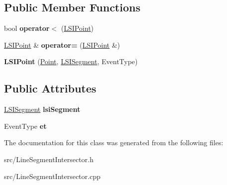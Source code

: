 \subsection*{Public Member Functions}
\begin{DoxyCompactItemize}
\item 
\mbox{\label{classLineSegmentIntersector_1_1LSIPoint_a1b3ac13032c42bad86516cbcf953db66}} 
bool {\bfseries operator$<$} (\hyperlink{classLineSegmentIntersector_1_1LSIPoint}{L\+S\+I\+Point})
\item 
\mbox{\label{classLineSegmentIntersector_1_1LSIPoint_ac547954aaa117fd416bb84a4a7447e56}} 
\hyperlink{classLineSegmentIntersector_1_1LSIPoint}{L\+S\+I\+Point} \& {\bfseries operator=} (\hyperlink{classLineSegmentIntersector_1_1LSIPoint}{L\+S\+I\+Point} \&)
\item 
\mbox{\label{classLineSegmentIntersector_1_1LSIPoint_a00b901f7dd62d86e3523c6592e9c1514}} 
{\bfseries L\+S\+I\+Point} (\hyperlink{classPoint}{Point}, \hyperlink{classLineSegmentIntersector_1_1LSISegment}{L\+S\+I\+Segment}, Event\+Type)
\end{DoxyCompactItemize}
\subsection*{Public Attributes}
\begin{DoxyCompactItemize}
\item 
\mbox{\label{classLineSegmentIntersector_1_1LSIPoint_ab84e13cb9e39eeca6d8af71d4b09582d}} 
\hyperlink{classLineSegmentIntersector_1_1LSISegment}{L\+S\+I\+Segment} {\bfseries lsi\+Segment}
\item 
\mbox{\label{classLineSegmentIntersector_1_1LSIPoint_a01054b1139f1e58e5af7b45213dd3c57}} 
Event\+Type {\bfseries et}
\end{DoxyCompactItemize}


The documentation for this class was generated from the following files\+:\begin{DoxyCompactItemize}
\item 
src/Line\+Segment\+Intersector.\+h\item 
src/Line\+Segment\+Intersector.\+cpp\end{DoxyCompactItemize}
